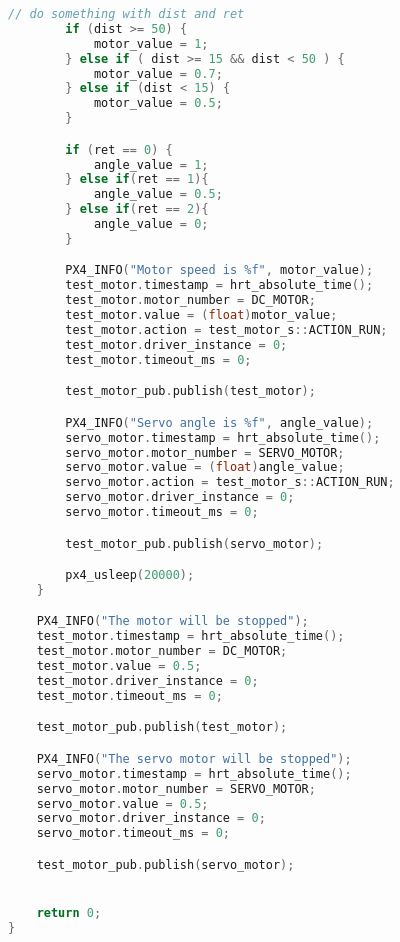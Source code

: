 \begin{lstlisting}[language=c++,caption=Part 2 C++ Code, label=list:part2_cpp]
        // do something with dist and ret
        if (dist >= 50) {
            motor_value = 1;
        } else if ( dist >= 15 && dist < 50 ) {
            motor_value = 0.7;
        } else if (dist < 15) {
            motor_value = 0.5;
        }

        if (ret == 0) {
            angle_value = 1;
        } else if(ret == 1){
            angle_value = 0.5;
        } else if(ret == 2){
            angle_value = 0;
        }

        PX4_INFO("Motor speed is %f", motor_value);
        test_motor.timestamp = hrt_absolute_time();
        test_motor.motor_number = DC_MOTOR;
        test_motor.value = (float)motor_value;
        test_motor.action = test_motor_s::ACTION_RUN;
        test_motor.driver_instance = 0;
        test_motor.timeout_ms = 0;

        test_motor_pub.publish(test_motor);

        PX4_INFO("Servo angle is %f", angle_value);
        servo_motor.timestamp = hrt_absolute_time();
        servo_motor.motor_number = SERVO_MOTOR;
        servo_motor.value = (float)angle_value;
        servo_motor.action = test_motor_s::ACTION_RUN;
        servo_motor.driver_instance = 0;
        servo_motor.timeout_ms = 0;

        test_motor_pub.publish(servo_motor);

        px4_usleep(20000);
    }

    PX4_INFO("The motor will be stopped");
    test_motor.timestamp = hrt_absolute_time();
    test_motor.motor_number = DC_MOTOR;
    test_motor.value = 0.5;
    test_motor.driver_instance = 0;
    test_motor.timeout_ms = 0;

    test_motor_pub.publish(test_motor);

    PX4_INFO("The servo motor will be stopped");
    servo_motor.timestamp = hrt_absolute_time();
    servo_motor.motor_number = SERVO_MOTOR;
    servo_motor.value = 0.5;
    servo_motor.driver_instance = 0;
    servo_motor.timeout_ms = 0;

    test_motor_pub.publish(servo_motor);


    return 0;
}
\end{lstlisting}
